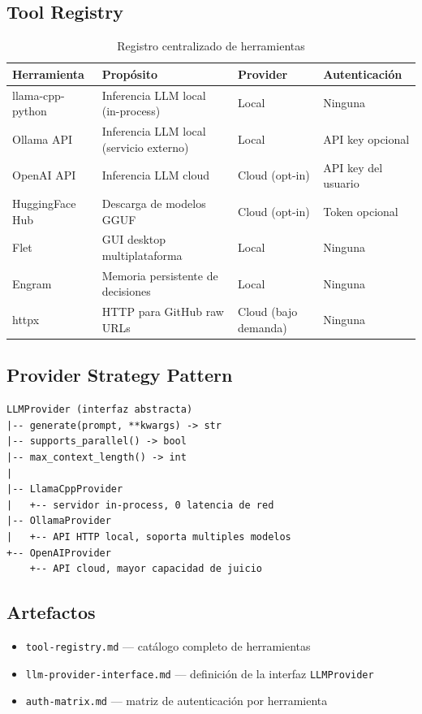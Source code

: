 \documentclass[12pt,a4paper]{article}
\begin{document}
\subsection*{Tool Registry}
\begin{table}[h]
\centering
\begin{tabular}{llll}
\toprule
\textbf{Herramienta} & \textbf{Propósito} & \textbf{Provider} & \textbf{Autenticación} \\
\midrule
llama-cpp-python    & Inferencia LLM local (in-process) & Local  & Ninguna \\
Ollama API          & Inferencia LLM local (servicio externo) & Local & API key opcional \\
OpenAI API          & Inferencia LLM cloud & Cloud (opt-in) & API key del usuario \\
HuggingFace Hub     & Descarga de modelos GGUF & Cloud (opt-in) & Token opcional \\
Flet                & GUI desktop multiplataforma & Local  & Ninguna \\
Engram              & Memoria persistente de decisiones & Local  & Ninguna \\
httpx               & HTTP para GitHub raw URLs & Cloud (bajo demanda) & Ninguna \\
\bottomrule
\end{tabular}
\caption{Registro centralizado de herramientas}
\end{table}

\subsection*{Provider Strategy Pattern}

\begin{verbatim}
LLMProvider (interfaz abstracta)
|-- generate(prompt, **kwargs) -> str
|-- supports_parallel() -> bool
|-- max_context_length() -> int
|
|-- LlamaCppProvider
|   +-- servidor in-process, 0 latencia de red
|-- OllamaProvider
|   +-- API HTTP local, soporta multiples modelos
+-- OpenAIProvider
    +-- API cloud, mayor capacidad de juicio
\end{verbatim}

\subsection*{Artefactos}
\begin{itemize}
  \item \texttt{tool-registry.md} --- catálogo completo de herramientas
  \item \texttt{llm-provider-interface.md} --- definición de la interfaz \texttt{LLMProvider}
  \item \texttt{auth-matrix.md} --- matriz de autenticación por herramienta
\end{itemize}
\end{document}
